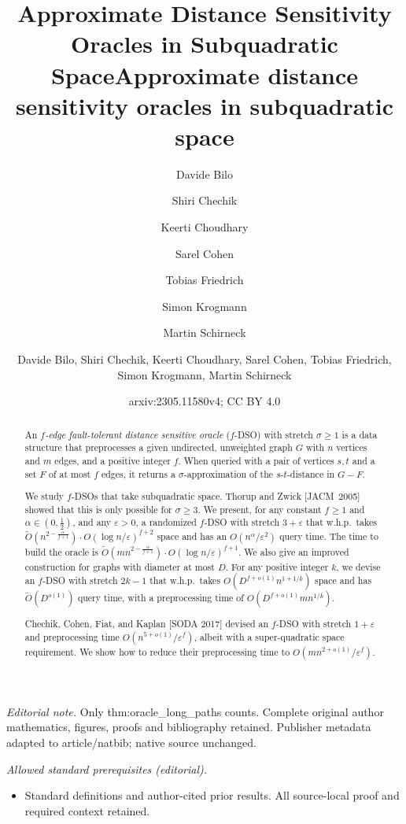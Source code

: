 \documentclass{article}\usepackage[a4paper,margin=20mm]{geometry}
\title{Approximate Distance Sensitivity Oracles in Subquadratic Space}
\author{Davide Bilo \and Shiri Chechik \and Keerti Choudhary \and Sarel Cohen \and Tobias Friedrich \and Simon Krogmann \and Martin Schirneck}\date{}
\title{Approximate distance sensitivity oracles in subquadratic space}
\author{Davide Bilo, Shiri Chechik, Keerti Choudhary, Sarel Cohen, Tobias Friedrich, Simon Krogmann, Martin Schirneck}
\date{arxiv:2305.11580v4; CC BY 4.0}
\renewcommand{\ge}{\geqslant}
\begin{document}
\maketitle
\noindent\textit{Editorial note.} Only thm:oracle\_long\_paths counts. Complete original author mathematics, figures, proofs and bibliography retained. Publisher metadata adapted to article/natbib; native source unchanged.\par\medskip
\noindent\textit{Allowed standard prerequisites (editorial).}\begin{itemize}
\item Standard definitions and author-cited prior results. All source-local proof and required context retained.
\end{itemize}\medskip
\maketitle

\begin{abstract}
	An \emph{\(f\)-edge fault-tolerant distance sensitive oracle} (\(f\)-DSO) with stretch \(\sigma \ge 1\)
	is a data structure that preprocesses a given undirected, unweighted graph \(G\) with \(n\) vertices and \(m\) edges, 
	and a positive integer \(f\).
	When queried with a pair of vertices \(s, t\) and a set \(F\) of at most \(f\) edges,
	it returns a \(\sigma\)-approximation of the \(s\)-\(t\)-distance in \(G-F\).

	We study \(f\)-DSOs that take subquadratic space.
	Thorup and Zwick [JACM~2005] showed that this is only possible for \(\sigma \ge 3\).
	We present, for any constant \(f \ge 1\) and \(\alpha \in (0, \frac{1}{2})\), 
	and any \(\varepsilon  > 0\), 
	a randomized \mbox{\(f\)-DSO} with stretch \( 3 + \varepsilon\)
	that w.h.p.\ takes 
	\(\widetilde{O}(n^{2-\frac{\alpha}{f+1}}) \cdot O(\log n/\varepsilon)^{f+2}\)
	space and has an \(O(n^\alpha/\varepsilon^2)\) query time.
	The time to build the oracle is \(\widetilde{O}(mn^{2-\frac{\alpha}{f+1}}) \cdot O(\log n/\varepsilon)^{f+1}\).
	We also give an improved construction for graphs with diameter at most \(D\).
	For any positive integer \(k\), we devise an \(f\)-DSO with stretch \(2k-1\) that w.h.p.\ takes
	\(O(D^{f+o(1)} n^{1+1/k})\) space and has \(\widetilde{O}(D^{o(1)})\) query time,
	with a preprocessing time of \(O(D^{f+o(1)} mn^{1/k})\).
  
	Chechik, Cohen, Fiat, and Kaplan [SODA 2017] devised an \(f\)-DSO with stretch \(1{+}\varepsilon\) 
	and preprocessing time $O(n^{5+o(1)}/\varepsilon^f)$, 
	albeit with a super-quadratic space requirement.
	We show how to reduce their preprocessing time to $O(mn^{2+o(1)}/\varepsilon^f)$.
\end{abstract}
\end{document}
